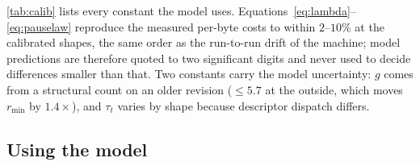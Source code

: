 \begin{table}[t]
\centering
\small
{}
\caption{Calibrated constants. The $c_s$ floor and the $\tau_s$ worst case are different
measurements -- the first is amortized over whole-dead-slab elision, the second is the per-slot cost
when slots must actually be freed -- which is why $c_s\cdot 16 < \tau_s$.}
\label{tab:calib}
\end{table}

\tab\ref{tab:calib} lists every constant the model uses.
Equations~\ref{eq:lambda}--\ref{eq:pauselaw} reproduce the measured per-byte costs to within
$2$--$10\%$ at the calibrated shapes, the same order as the run-to-run drift of the machine;
model predictions are therefore quoted to two significant digits and never used to decide differences
smaller than that.
Two constants carry the model uncertainty: $g$ comes from a structural count on an older revision
($\le 5.7$ at the outside, which moves $r_{\min}$ by $1.4\times$), and $\tau_t$ varies by shape
because descriptor dispatch differs.

\subsection{Using the model}
\label{sec:roofline-use}

